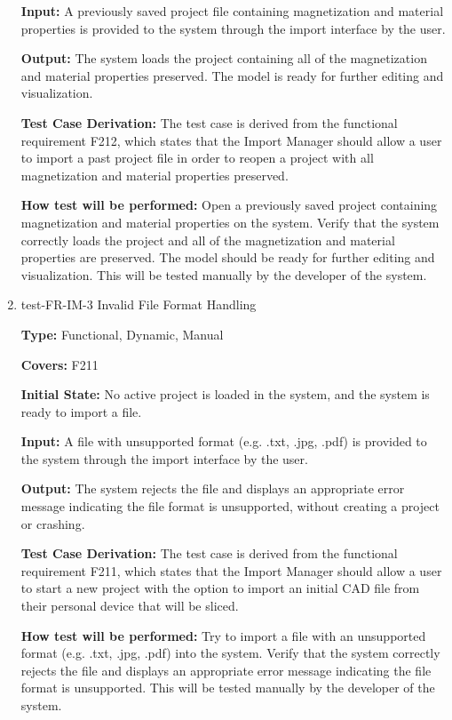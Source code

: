 \documentclass[12pt, titlepage]{article}
\begin{document}
\begin{enumerate}
\textbf{Input:} A previously saved project file containing magnetization and material properties is provided to the system through the import interface by the user.
					
\textbf{Output:} The system loads the project containing all of the magnetization and material properties preserved. The model is ready for further editing and visualization.

\textbf{Test Case Derivation:} The test case is derived from the functional requirement F212, which states that the Import Manager should allow a user to import a past project file in order to reopen a project with all magnetization and material properties preserved.
					
\textbf{How test will be performed:} Open a previously saved project containing magnetization and material properties on the system. Verify that the system correctly loads the project and all of the magnetization and material properties are preserved. The model should be ready for further editing and visualization. This will be tested manually by the developer of the system.

\item{test-FR-IM-3 Invalid File Format Handling\\}

\textbf{Type:} Functional, Dynamic, Manual

\textbf{Covers:} F211
					
\textbf{Initial State:} No active project is loaded in the system, and the system is ready to import a file.
					
\textbf{Input:} A file with unsupported format (e.g. .txt, .jpg, .pdf) is provided to the system through the import interface by the user.
					
\textbf{Output:} The system rejects the file and displays an appropriate error message indicating the file format is unsupported, without creating a project or crashing.

\textbf{Test Case Derivation:} The test case is derived from the functional requirement F211, which states that the Import Manager should allow a user to start a new project with the option to import an initial CAD file from their personal device that will be sliced. 
					
\textbf{How test will be performed:} Try to import a file with an unsupported format (e.g. .txt, .jpg, .pdf) into the system. Verify that the system correctly rejects the file and displays an appropriate error message indicating the file format is unsupported. This will be tested manually by the developer of the system.

\end{enumerate}
\end{document}
